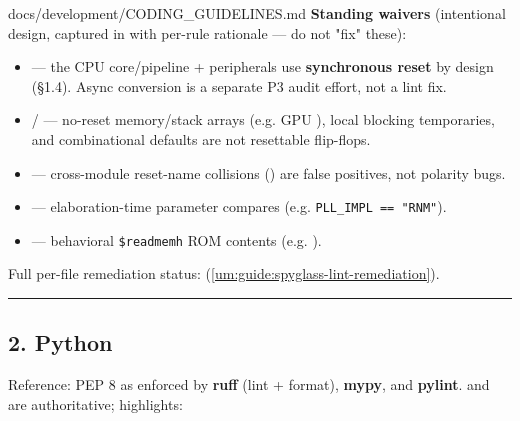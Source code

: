 \begin{relocated}{docs/development/CODING_GUIDELINES.md}
\textbf{Standing waivers} (intentional design, captured in
 with per-rule rationale --- do not "fix"
these):

\begin{itemize}
\tightlist
\item
   --- the CPU core/\allowbreak{}pipeline +
  peripherals use \textbf{synchronous reset} by design (§1.4). Async
  conversion is a separate P3 audit effort, not a lint fix.
\item
   /  --- no-reset
  memory/\allowbreak{}stack arrays (e.g. GPU ), local
  blocking temporaries, and combinational defaults are not resettable
  flip-flops.
\item
   --- cross-module reset-name collisions ()
  are false positives, not polarity bugs.
\item
   --- elaboration-time  parameter
  compares (e.g.
  \texttt{PLL\_\allowbreak{}IMPL\ =\allowbreak{}=\allowbreak{}\ "RNM"}).
\item
   --- behavioral \texttt{\$readmemh} ROM
  contents (e.g. ).
\end{itemize}

Full per-file remediation status:
 (\cref{um:guide:spyglass-lint-remediation}).

\begin{center}\rule{0.5\linewidth}{0.5pt}\end{center}

\subsection{2. Python}\label{um:guide:coding-guidelines:2-python}

Reference: PEP 8 as enforced by \textbf{ruff} (lint + format),
\textbf{mypy}, and \textbf{pylint}.  and
 are authoritative; highlights:


\end{relocated}
